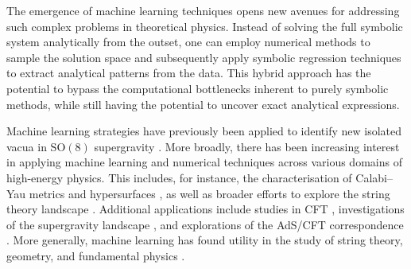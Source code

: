 \documentclass[11pt,a4paper]{article}
\begin{document}
The emergence of machine learning techniques opens new avenues for addressing such complex problems in theoretical physics. Instead of solving the full symbolic system analytically from the outset, one can employ numerical methods to sample the solution space and subsequently apply symbolic regression techniques to extract analytical patterns from the data. This hybrid approach has the potential to bypass the computational bottlenecks inherent to purely symbolic methods, while still having the potential to uncover exact analytical expressions.

Machine learning strategies have previously been applied to identify new isolated vacua in $\mathrm{SO}(8)$ supergravity \cite{Comsa:2019rcz,Berman:2022jqn}. More broadly, there has been increasing interest in applying machine learning and numerical techniques across various domains of high-energy physics. This includes, for instance, the characterisation of Calabi–Yau metrics and hypersurfaces \cite{Ashmore:2019wzb,Berman:2021mcw,Larfors:2022nep,Berglund:2022gvm,Jejjala:2020wcc,Douglas:2006rr,Larfors:2021pbb,He:2018jtw}, as well as broader efforts to explore the string theory landscape \cite{He:2017aed,Carifio:2017bov,Ruehle:2017mzq,Walden:2025cpf}. Additional applications include studies in CFT \cite{Chen:2020dxg}, investigations of the supergravity landscape \cite{Brady:2025zzi,Krishnan:2020sfg}, and explorations of the AdS/CFT correspondence \cite{Hashimoto:2018ftp}. More generally, machine learning has found utility in the study of string theory, geometry, and fundamental physics \cite{Ruehle:2020jrk,He:2023csq,Bao:2021auj}.
\end{document}
